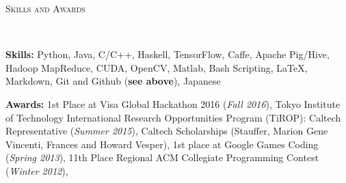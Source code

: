 \documentclass[9pt]{article}
\newenvironment{changemargin}[2]{%
  \begin{list}{}{%
    \setlength{\topsep}{0pt}%
    \setlength{\leftmargin}{#1}%
    \setlength{\rightmargin}{#2}%
    \setlength{\listparindent}{\parindent}%
    \setlength{\itemindent}{\parindent}%
    \setlength{\parsep}{\parskip}%
  }%
  \item[]}{\end{list}
}
\newcommand{\lineover}{
	\begin{changemargin}{-0.05in}{-0.05in}
		\vspace*{-8pt}
		\hrulefill \\
		\vspace*{-2pt}
	\end{changemargin}
}
\newcommand{\header}[1]{
	\begin{changemargin}{-0.5in}{-0.5in}
		\scshape{#1}\\
  	\lineover
	\end{changemargin}
}
\newenvironment{body} {
	\vspace*{-16pt}
	\begin{changemargin}{-0.25in}{-0.5in}
  }	
	{\end{changemargin}
}
\begin{document}
\header{Skills and Awards}
\smallskip
\begin{body}
	\vspace{14pt}
	
		\textbf{Skills:} Python, Java, C/C++, Haskell, TensorFlow, Caffe, Apache Pig/Hive, Hadoop MapReduce, CUDA, OpenCV, Matlab, Bash Scripting, \LaTeX, Markdown, Git and Github (\textbf{see above}), Japanese\\
	
	\medskip
	
	\textbf{Awards:} 1st Place at Visa Global Hackathon 2016 (\emph{Fall 2016}), 
    				Tokyo Institute of Technology International Research Opportunities Program (TiROP): Caltech Representative (\emph{Summer 2015}), 
                    Caltech Scholarships (Stauffer, Marion Gene Vincenti, Frances and Howard Vesper),
        1st place at Google Games Coding (\emph{Spring 2013}),
        11th Place Regional ACM Collegiate Programming Contest (\emph{Winter 2012}),
	
	
%
\end{body}
\end{document}
